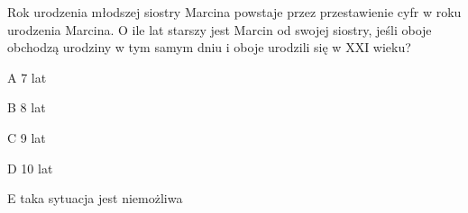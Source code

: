 \begin{tresc}
Rok urodzenia młodszej siostry Marcina powstaje przez przestawienie cyfr w roku urodzenia Marcina. O ile lat starszy jest Marcin od swojej siostry, jeśli oboje obchodzą urodziny w tym samym dniu i oboje urodzili się w XXI wieku?
\end{tresc}
\begin{wariant}{A} 7 lat \end{wariant}
\begin{wariant}{B} 8 lat \end{wariant}
\begin{wariant}{C} 9 lat \end{wariant}
\begin{wariant}{D} 10 lat \end{wariant}
\begin{wariant}{E} taka sytuacja jest niemożliwa \end{wariant}
